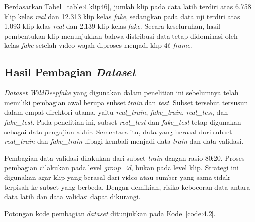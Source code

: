 Berdasarkan Tabel~\ref{table:4.klip46}, jumlah klip pada data latih terdiri atas 6.758 klip kelas \textit{real} dan 12.313 klip kelas \textit{fake}, sedangkan pada data uji terdiri atas 1.093 klip kelas \textit{real} dan 2.139 klip kelas \textit{fake}. Secara keseluruhan, hasil pembentukan klip menunjukkan bahwa distribusi data tetap didominasi oleh kelas \textit{fake} setelah video wajah diproses menjadi klip 46 \textit{frame}.

\subsection{Hasil Pembagian \textit{Dataset}} \label{IV.Split}
\textit{Dataset} \textit{WildDeepfake} yang digunakan dalam penelitian ini sebelumnya telah memiliki pembagian awal berupa subset \textit{train} dan \textit{test}. Subset tersebut tersusun dalam empat direktori utama, yaitu \textit{real\_train}, \textit{fake\_train}, \textit{real\_test}, dan \textit{fake\_test}. Pada penelitian ini, subset \textit{real\_test} dan \textit{fake\_test} tetap digunakan sebagai data pengujian akhir. Sementara itu, data yang berasal dari subset \textit{real\_train} dan \textit{fake\_train} dibagi kembali menjadi data \textit{train} dan data validasi.

Pembagian data validasi dilakukan dari subset \textit{train} dengan rasio 80:20. Proses pembagian dilakukan pada level \textit{group\_id}, bukan pada level klip. Strategi ini digunakan agar klip yang berasal dari video atau sumber yang sama tidak terpisah ke subset yang berbeda. Dengan demikian, risiko kebocoran data antara data latih dan data validasi dapat dikurangi.

Potongan kode pembagian \textit{dataset} ditunjukkan pada Kode~\ref{code:4.2}.

